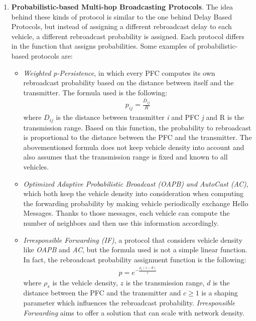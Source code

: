 \begin{enumerate}
			\item \textbf{Probabilistic-based Multi-hop Broadcasting Protocols}.
			The idea behind these kinds of protocol is similar to the one behind Delay Based Protocols, but instead of assigning a different rebroadcast delay to each vehicle, a different rebroadcast probability is assigned. Each protocol differs in the function that assigns probabilities. Some examples of probabilistic-based protocols are:
			\begin{itemize}
				\renewcommand\labelitemi{--}
				\item \textit{Weighted p-Persistence}\cite{4407231}, in which every PFC computes its own rebroadcast probability based on the distance between itself and the transmitter. The formula used is the following:
				\begin{gather}
					p_{ij} = \frac{D_{ij}}{R}
					\label{eq:weighted-p-persistence}
				\end{gather}
				where $D_{ij}$ is the distance between transmitter \textit{i} and PFC \textit{j} and R is the transmission range. Based on this function, the probability to rebroadcast is proportional to the distance between the PFC and the transmitter. The abovementioned formula does not keep vehicle density into account and also assumes that the transmission range is fixed and known to all vehicles.
				
				\item \textit{Optimized Adaptive Probabilistic Broadcast (OAPB)\cite{1543865} and AutoCast (AC)\cite{4350058}}, which both keep the vehicle density into consideration when computing the forwarding probability by making vehicle periodically exchange Hello Messages. Thanks to those messages, each vehicle can compute the number of neighbors and then use this information accordingly.
				
				\item \textit{Irresponsible Forwarding (IF)}\cite{4740277}\cite{5426212}, a protocol that considers vehicle density like \textit{OAPB} and \textit{AC}, but the formula used is not a simple linear function. In fact, the rebroadcast probability assignment function is the following:
				\begin{gather}
					p = e^{-\frac{\rho_s(z-d)}{c}}
				\end{gather}
				where $\rho_s$ is the vehicle density, $z$ is the transmission range, $d$ is the distance between the PFC and the transmitter and $c\geq1$ is a shaping parameter which influences the rebroadcast probability. \textit{Irresponsible Forwarding} aims to offer a solution that can scale with network density.
			\end{itemize}
		\end{enumerate}
		
